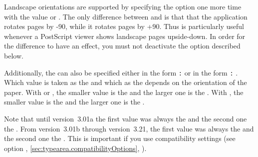 Landscape orientations are supported by specifying the option one more time
with the value  or
. The only difference
between  and  is that that the application
 rotates  pages by -90\Unit{\textdegree}, while
it rotates  pages by +90\Unit{\textdegree}. Thus
 is particularly useful whenever a PostScript viewer shows
landscape pages upside-down. In order for the difference to have an effect,
you must not deactivate the %
 option
described below.

Additionally, the  can also be specified either in the form
\texttt{:}%
 or in the form
\texttt{:}%
. Which value is taken
as the  and which as the  depends on the
orientation of the paper. With  or
, the smaller value is the  and the
larger one is the . With
, the
smaller value is the  and the larger one is the .

Note that until version~3.01a the first value was always
the  and the second one the . From version~3.01b
through version~3.21, the first value was always the  and the
second one the . This is important if you use compatibility
settings (see option %
,
\autoref{sec:typearea.compatibilityOptions},
).

